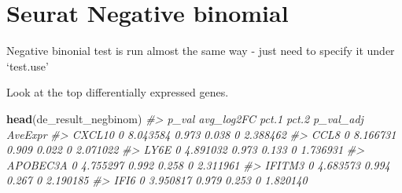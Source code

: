 \documentclass[
]{book}
\newenvironment{Shaded}{\begin{snugshade}}{\end{snugshade}}
\newcommand{\AttributeTok}[1]{\textcolor[rgb]{0.13,0.29,0.53}{#1}}
\newcommand{\CommentTok}[1]{\textcolor[rgb]{0.56,0.35,0.01}{\textit{#1}}}
\newcommand{\DecValTok}[1]{\textcolor[rgb]{0.00,0.00,0.81}{#1}}
\newcommand{\FunctionTok}[1]{\textcolor[rgb]{0.13,0.29,0.53}{\textbf{#1}}}
\newcommand{\NormalTok}[1]{#1}
\newcommand{\OtherTok}[1]{\textcolor[rgb]{0.56,0.35,0.01}{#1}}
\newcommand{\SpecialCharTok}[1]{\textcolor[rgb]{0.81,0.36,0.00}{\textbf{#1}}}
\newcommand{\StringTok}[1]{\textcolor[rgb]{0.31,0.60,0.02}{#1}}
\begin{document}
\section{Seurat Negative binomial}\label{seurat-negative-binomial}

Negative binonial test is run almost the same way - just need to specify it under `test.use'

\begin{Shaded}
\end{Shaded}

Look at the top differentially expressed genes.

\begin{Shaded}
\begin{Highlighting}[]
\FunctionTok{head}\NormalTok{(de\_result\_negbinom)}
\CommentTok{\#\textgreater{}          p\_val avg\_log2FC pct.1 pct.2 p\_val\_adj  AveExpr}
\CommentTok{\#\textgreater{} CXCL10       0   8.043584 0.973 0.038         0 2.388462}
\CommentTok{\#\textgreater{} CCL8         0   8.166731 0.909 0.022         0 2.071022}
\CommentTok{\#\textgreater{} LY6E         0   4.891032 0.973 0.133         0 1.736931}
\CommentTok{\#\textgreater{} APOBEC3A     0   4.755297 0.992 0.258         0 2.311961}
\CommentTok{\#\textgreater{} IFITM3       0   4.683573 0.994 0.267         0 2.190185}
\CommentTok{\#\textgreater{} IFI6         0   3.950817 0.979 0.253         0 1.820140}
\end{Highlighting}
\end{Shaded}
\end{document}
